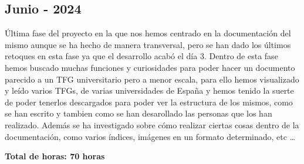\documentclass[a4paper]{article}
\begin{document}
\subsection{Junio - 2024}
Última fase del proyecto en la que nos hemos centrado en la documentación del mismo aunque se ha hecho de manera transversal, pero se han dado los últimos retoques en esta fase ya que el desarrollo acabó el día 3. Dentro de esta fase hemos buscado muchas funciones y curiosidades para poder hacer un documento parecido a un TFG universitario pero a menor escala, para ello hemos visualizado y leído varios TFGs, de varias universidades de España y hemos tenido la suerte de poder tenerlos descargados para poder ver la estructura de los mismos, como se han escrito y tambien como se han desarollado las personas que los han realizado. Además se ha investigado sobre cómo realizar ciertas cosas dentro de la documentación, como varios índices, imágenes en un formato determinado, etc \dots
\begin{flushright}
    \bf Total de horas: 70 horas
\end{flushright}
\end{document}
